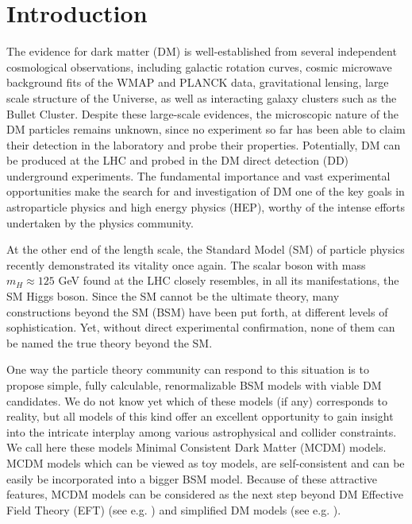\documentclass[12pt,a4paper]{article}
\begin{document}
\section{Introduction}

The evidence for dark matter (DM) is well-established from several independent cosmological observations, 
including galactic rotation curves, cosmic microwave background fits of the WMAP and PLANCK data, 
gravitational lensing, large scale structure of the Universe, as well as interacting galaxy clusters such as the Bullet Cluster.
Despite these large-scale evidences, the microscopic nature of the DM particles remains unknown,
since no experiment so far has been able to claim their detection in the laboratory and probe their properties.
Potentially, DM can be produced at the LHC and probed in the DM direct detection (DD) underground experiments.
The fundamental importance and vast experimental opportunities make the search for and investigation of DM 
one of the key goals in astroparticle physics and high energy physics (HEP), worthy of the intense efforts undertaken by the physics community.


At the other end of the length scale, the Standard Model (SM) of particle physics recently demonstrated its vitality once again.
The scalar boson with mass $m_H \approx 125$ GeV found at the LHC \cite{Chatrchyan:2012xdj,Aad:2012tfa} 
closely resembles, in all its manifestations,
the SM Higgs boson. Since the SM cannot be the ultimate theory, many constructions beyond the SM (BSM) 
have been put forth, at different levels of sophistication. Yet, without direct experimental confirmation,
none of them can be named the true theory beyond the SM.

One way the particle theory community can respond to this situation is to propose simple, fully calculable, renormalizable BSM models 
with viable DM candidates. We do not know yet which  of these models (if any) corresponds to reality,
but all models of this kind offer an excellent opportunity to gain insight into the intricate interplay among various
astrophysical and collider constraints. We call here these models Minimal Consistent Dark Matter (MCDM) models.
MCDM models which can be  viewed as  toy models, are self-consistent and can be easily be incorporated into a bigger BSM model.
Because of these attractive features, MCDM models can be considered as the next step beyond DM Effective Field Theory (EFT) (see e.g. \cite{Fox:2011pm,Rajaraman:2011wf,Goodman:2010ku,Bai:2010hh,Beltran:2010ww,Goodman:2010yf,Fox:2011fx,Shoemaker:2011vi,Fox:2012ru,Haisch:2012kf,Busoni:2013lha,Busoni2014a,Belyaev:2016pxe}) and simplified DM models (see e.g. \cite{Buchmueller:2013dya,Busoni:2014sya,Busoni:2014haa,Buchmueller:2014yoa,Buckley:2014fba,Abdallah:2015ter,Abdallah:2014hon,Abercrombie:2015wmb}).
\end{document}
